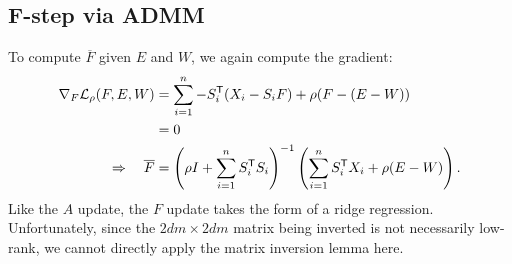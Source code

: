 \documentclass{article}
\begin{document}
\subsection{F-step via ADMM}
To compute $\overline{F}$ given $E$ and $W$, we again compute the gradient:
\begin{align*}
\nabla_F \mathcal{L}_\rho(F, E, W) &= \sum_{i=1}^n -S_i^\mathsf{T} (X_i - S_i F) + \rho (F - (E - W)
)\\
&= 0\\
\Rightarrow \quad \overline{F} &= \left(\rho I + \sum_{i=1}^n S_i^\mathsf{T} S_i
\right)^{-1} \left(\sum_{i=1}^n S_i^\mathsf{T} X_i + \rho(E - W) \right).
\end{align*}
Like the $A$ update, the $F$ update takes the form of a ridge regression.
Unfortunately, since the $2dm\times 2dm$ matrix being inverted is not necessarily low-rank, we cannot
directly apply the matrix inversion lemma here.

\end{document}
